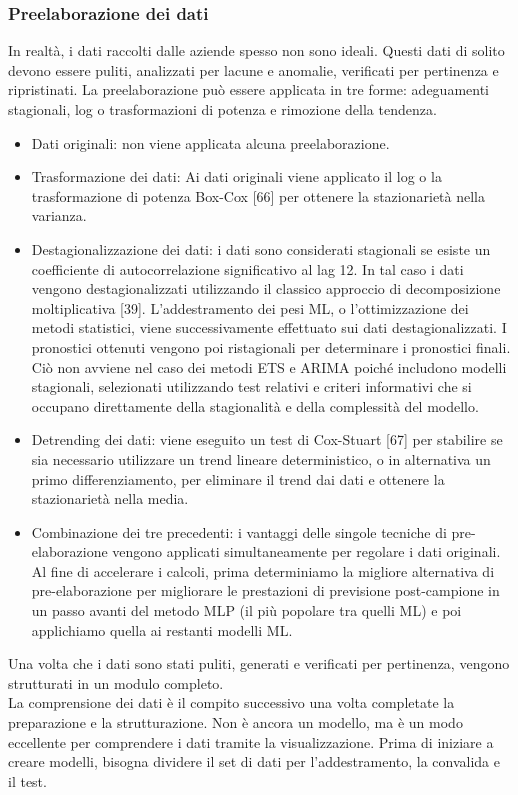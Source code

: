 \documentclass[12pt,a4paper]{report}
\begin{document}
\subsubsection{Preelaborazione dei dati}
In realtà, i dati raccolti dalle aziende spesso non sono ideali. Questi dati di solito devono essere puliti, analizzati per lacune e anomalie, verificati per pertinenza e ripristinati.
La preelaborazione può essere applicata in tre forme: adeguamenti stagionali, log o trasformazioni di potenza e rimozione della tendenza.
\begin{itemize}
    \item Dati originali: non viene applicata alcuna preelaborazione.
    \item Trasformazione dei dati: Ai dati originali viene applicato il log o la trasformazione di potenza Box-Cox [66] per ottenere la stazionarietà nella varianza.
    \item Destagionalizzazione dei dati: i dati sono considerati stagionali se esiste un coefficiente di autocorrelazione significativo al lag 12. In tal caso i dati vengono destagionalizzati utilizzando il classico approccio di decomposizione moltiplicativa [39]. L'addestramento dei pesi ML, o l'ottimizzazione dei metodi statistici, viene successivamente effettuato sui dati destagionalizzati. I pronostici ottenuti vengono poi ristagionali per determinare i pronostici finali. Ciò non avviene nel caso dei metodi ETS e ARIMA poiché includono modelli stagionali, selezionati utilizzando test relativi e criteri informativi che si occupano direttamente della stagionalità e della complessità del modello.
    \item Detrending dei dati: viene eseguito un test di Cox-Stuart [67] per stabilire se sia necessario utilizzare un trend lineare deterministico, o in alternativa un primo differenziamento, per eliminare il trend dai dati e ottenere la stazionarietà nella media.
    \item Combinazione dei tre precedenti: i vantaggi delle singole tecniche di pre-elaborazione vengono applicati simultaneamente per regolare i dati originali. Al fine di accelerare i calcoli, prima determiniamo la migliore alternativa di pre-elaborazione per migliorare le prestazioni di previsione post-campione in un passo avanti del metodo MLP (il più popolare tra quelli ML) e poi applichiamo quella ai restanti modelli ML.
\end{itemize}

Una volta che i dati sono stati puliti, generati e verificati per pertinenza, vengono strutturati in un modulo completo.\\
La comprensione dei dati è il compito successivo una volta completate la preparazione e la strutturazione. Non è ancora un modello, ma è un modo eccellente per comprendere i dati tramite la visualizzazione. 
Prima di iniziare a creare modelli, bisogna dividere il set di dati per l'addestramento, la convalida e il test.
\end{document}
